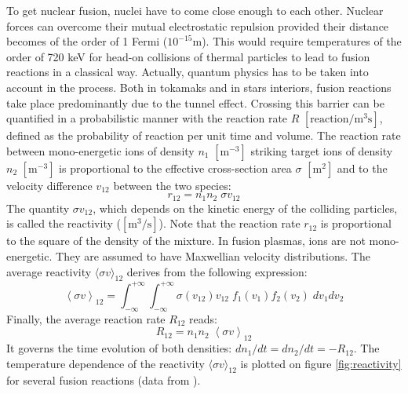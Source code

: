 To get nuclear fusion, nuclei have to come close enough to each other. Nuclear forces can overcome their mutual electrostatic repulsion provided their distance becomes of the order of 1 Fermi ($10^{-15}$m). This would require temperatures of the order of 720 keV for head-on collisions of thermal particles to lead to fusion reactions in a classical way. Actually, quantum physics has to be taken into account in the process. Both in tokamaks and in stars interiors, fusion reactions take place predominantly due to the tunnel effect. Crossing this barrier can be quantified in a probabilistic manner with the reaction rate $R$ $[\mathrm{reaction/m^3 s}]$, defined as the probability of reaction per unit time and volume. The reaction rate between mono-energetic ions of density $n_1$ $\mathrm{[m^{-3}]}$ striking target ions of density $n_2$ $\mathrm{[m^{-3}]}$ is proportional to the effective cross-section area $\sigma$ $\mathrm{[m^2]}$ and to the velocity difference $v_{12}$ between the two species:
\begin{equation*}
r_{12} = n_1 n_2 \; \sigma v_{12}
\end{equation*}
The quantity  $\sigma v_{12}$, which depends on the kinetic energy of the colliding particles, is called the reactivity ($\mathrm{[m^3/s]}$). Note that the reaction rate $r_{12}$ is proportional to the square of the density of the mixture. In fusion plasmas, ions are not mono-energetic. They are assumed to have Maxwellian velocity distributions. The average reactivity $\langle \sigma v \rangle_{12}$ derives from the following expression:
\begin{equation*}
\left < \sigma v \right >_{12} 
= \int_{-\infty}^{+\infty} \int_{-\infty}^{+\infty} 
\sigma(v_{12}) v_{12}\;  f_1(v_1) f_2(v_2) \; dv_1dv_2
\end{equation*}
Finally, the average reaction rate $R_{12}$ reads:
\begin{equation*}
R_{12} = n_1 n_2 \; \left < \sigma v \right >_{12}
\end{equation*}
It governs the time evolution of both densities: $dn_1/dt = dn_2/dt = -R_{12}$.
The temperature dependence of the reactivity $\langle \sigma v \rangle_{12}$ is plotted on figure \ref{fig:reactivity} for several fusion reactions (data from \cite{Huba2013}).

